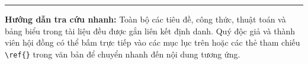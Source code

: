 \documentclass[11pt,a4paper]{article}
\begin{document}
\newpage
{}
\hypertarget{toc}{}
\tableofcontents
\vspace{8mm}
\noindent\textcolor{TealPrimary}{\rule{\textwidth}{0.8pt}}
\vspace{4mm}

\noindent\textbf{Hướng dẫn tra cứu nhanh:} Toàn bộ các tiêu đề, công thức, thuật toán và bảng biểu trong tài liệu đều được gắn liên kết định danh. Quý độc giả và thành viên hội đồng có thể bấm trực tiếp vào các mục lục trên hoặc các thẻ tham chiếu \texttt{\textbackslash ref\{\}} trong văn bản để chuyển nhanh đến nội dung tương ứng.

\newpage

\newpage


\newpage


\newpage


\newpage


\newpage


\newpage


\newpage


\end{document}
